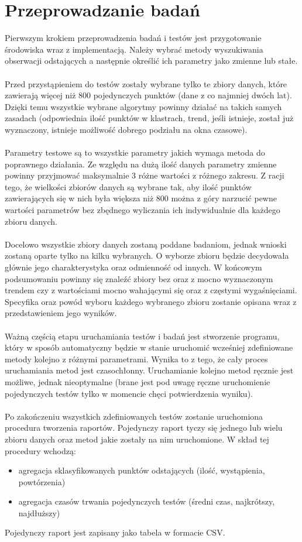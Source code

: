 \documentclass[eng,printmode]{mgr}
\begin{document}
\chapter{Przeprowadzanie badań}
Pierwszym krokiem przeprowadzenia badań i testów jest przygotowanie środowiska wraz z implementacją. Należy wybrać metody wyszukiwania obserwacji odstających a następnie określić ich parametry jako zmienne lub stałe.
\\\\
Przed przystąpieniem do testów zostały wybrane tylko te zbiory danych, które zawierają więcej niż 800 pojedynczych punktów (dane z co najmniej dwóch lat). Dzięki temu wszystkie wybrane algorytmy powinny działać na takich samych zasadach (odpowiednia ilość punktów w klastrach, trend, jeśli istnieje, został już wyznaczony, istnieje możliwość dobrego podziału na okna czasowe).
\\\\
Parametry testowe są to wszystkie parametry jakich wymaga metoda do poprawnego działania. Ze względu na dużą ilość danych parametry zmienne powinny przyjmować maksymalnie 3 różne wartości z różnego zakresu. Z racji tego, że wielkości zbiorów danych są wybrane tak, aby ilość punktów zawierających się w nich była większa niż 800 można z góry narzucić pewne wartości parametrów bez zbędnego wyliczania ich indywidualnie dla każdego zbioru danych.
\\\\
Docelowo wszystkie zbiory danych zostaną poddane badaniom, jednak wnioski zostaną oparte tylko na kilku wybranych. O wyborze zbioru będzie decydowała głównie jego charakterystyka oraz odmienność od innych. W końcowym podsumowaniu powinny się znaleźć zbiory bez oraz z mocno wyznaczonym trendem czy z wartościami mocno wahającymi się oraz z częstymi wygaśnięciami. Specyfika oraz powód wyboru każdego wybranego zbioru zostanie opisana wraz z przedstawieniem jego wyników.
\\\\
Ważną częścią etapu uruchamiania testów i badań jest stworzenie programu, który w sposób automatyczny będzie w stanie uruchomić wcześniej zdefiniowane metody kolejno z różnymi parametrami. Wynika to z tego, że cały proces uruchamiania metod jest czasochłonny. Uruchamianie kolejno metod ręcznie jest możliwe, jednak nieoptymalne (brane jest pod uwagę ręczne uruchomienie pojedynczych testów tylko w momencie chęci potwierdzenia wyniku). 
\\\\
Po zakończeniu wszystkich zdefiniowanych testów zostanie uruchomiona procedura tworzenia raportów. Pojedynczy raport tyczy się jednego lub wielu zbioru danych oraz metod jakie zostały na nim uruchomione. W skład tej procedury wchodzą:
\begin{itemize}
	\item agregacja sklasyfikowanych punktów odstających (ilość, wystąpienia, powtórzenia)
	\item agregacja czasów trwania pojedynczych testów (średni czas, najkrótszy, najdłuższy)
\end{itemize}
Pojedynczy raport jest zapisany jako tabela w formacie CSV.
\end{document}
